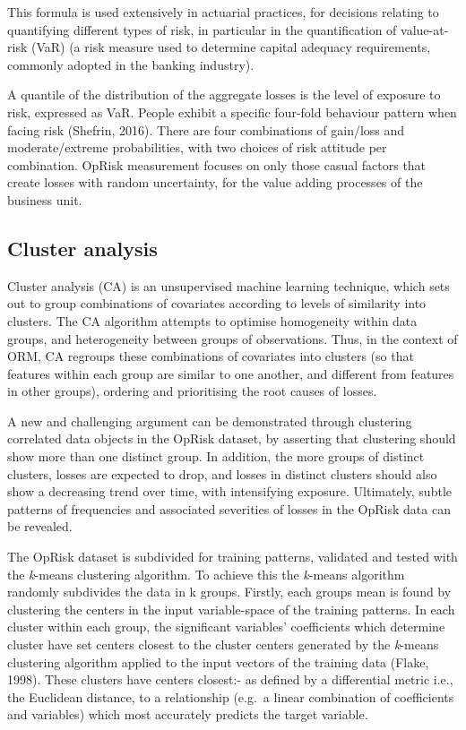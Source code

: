 \documentclass[]{DissertateUSU}
\begin{document}
This formula is used extensively in actuarial practices, for decisions
relating to quantifying different types of risk, in particular in the
quantification of value-at-risk (VaR) (a risk measure used to determine
capital adequacy requirements, commonly adopted in the banking
industry).\medskip

A quantile of the distribution of the aggregate losses is the level of
exposure to risk, expressed as VaR. People exhibit a specific four-fold
behaviour pattern when facing risk (Shefrin, 2016). There are four
combinations of gain/loss and moderate/extreme probabilities, with two
choices of risk attitude per combination. OpRisk measurement focuses on
only those casual factors that create losses with random uncertainty,
for the value adding processes of the business unit.

\subsection{Cluster analysis}

Cluster analysis (CA) is an unsupervised machine learning technique,
which sets out to group combinations of covariates according to levels
of similarity into clusters. The CA algorithm attempts to optimise
homogeneity within data groups, and heterogeneity between groups of
observations. Thus, in the context of ORM, CA regroups these
combinations of covariates into clusters (so that features within each
group are similar to one another, and different from features in other
groups), ordering and prioritising the root causes of losses.\medskip

A new and challenging argument can be demonstrated through clustering
correlated data objects in the OpRisk dataset, by asserting that
clustering should show more than one distinct group. In addition, the
more groups of distinct clusters, losses are expected to drop, and
losses in distinct clusters should also show a decreasing trend over
time, with intensifying exposure. Ultimately, subtle patterns of
frequencies and associated severities of losses in the OpRisk data can
be revealed.\medskip  

The OpRisk dataset is subdivided for training patterns, validated and
tested with the \emph{k}-means clustering algorithm. To achieve this the
\emph{k}-means algorithm randomly subdivides the data in k groups.
Firstly, each groups mean is found by clustering the centers in the
input variable-space of the training patterns. In each cluster within
each group, the significant variables' coefficients which determine
cluster have set centers closest to the cluster centers generated by the
\emph{k}-means clustering algorithm applied to the input vectors of the
training data (Flake, 1998). These clusters have centers closest:- as
defined by a differential metric i.e., the Euclidean distance, to a
relationship (e.g.~a linear combination of coefficients and variables)
which most accurately predicts the target variable.
\end{document}
